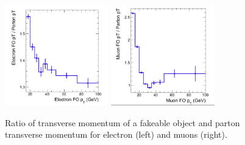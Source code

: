 \begin{figure}[!htbp]                                                                                         
\begin{center}                                                                                                
\includegraphics[width=0.4\textwidth]{figures/ElectronPtResponse.png}                                            
\includegraphics[width=0.4\textwidth]{figures/MuonPtResponse.png}\\                                           
\caption{Ratio of transverse momentum of a fakeable object and parton transverse momentum
for electron (left) and muons (right). }                                                                                 
\label{fig:ptresponse}                                                                                          
\end{center}                                                                                                  
\end{figure}   

